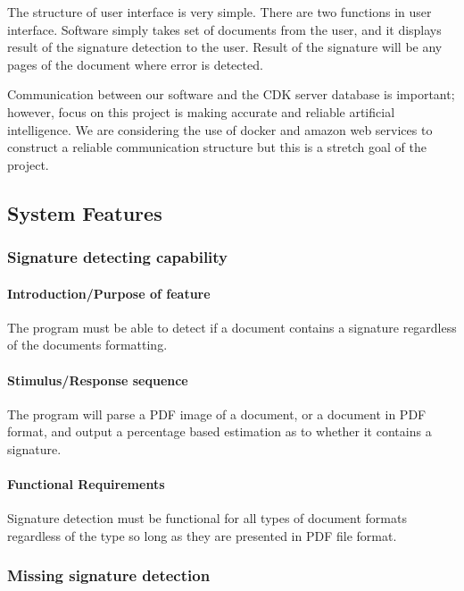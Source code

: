 \documentclass[onecolumn, draftclsnofoot,10pt, compsoc]{IEEEtran}
\begin{document}
The structure of user interface is very simple. There are two functions in user interface. Software simply takes set of documents from the user, and it displays result of the signature detection to the user. Result of the signature will be any pages of the document where error is detected.

Communication between our software and the CDK server database is important; however, focus on this project is making accurate and reliable artificial intelligence. We are considering the use of docker and amazon web services to construct a reliable communication structure but this is a stretch goal of the project.

\subsection{System Features}
\subsubsection{Signature detecting capability}\vspace{.5cm}

\hfill\begin{minipage}{\dimexpr\textwidth-1cm}
\paragraph{Introduction/Purpose of feature}
The program must be able to detect if a document contains a signature regardless of the documents formatting.
\paragraph{Stimulus/Response sequence}
The program will parse a PDF image of a document, or a document in PDF format, and output a percentage based estimation as to whether it contains a signature.
\paragraph{Functional Requirements}
Signature detection must be functional for all types of document formats regardless of the type so long as they are presented in PDF file format. 
\end{minipage}
\vspace{.75cm}


\subsubsection{Missing signature detection}\vspace{.5cm}
\end{document}
